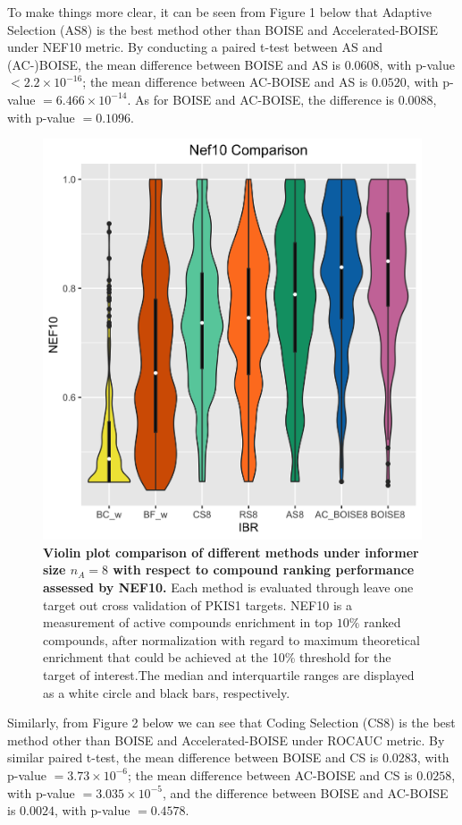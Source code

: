 \documentclass[12pt]{article}
\begin{document}
To make things more clear, it can be seen from Figure 1 below that Adaptive Selection (AS8) is the best method other than BOISE and Accelerated-BOISE under NEF10 metric. By conducting a paired t-test between AS and (AC-)BOISE, the mean difference between BOISE and AS is $0.0608$, with p-value $<2.2\times 10^{-16}$; the mean difference between AC-BOISE and AS is $0.0520$, with p-value $=6.466\times 10^{-14}$. As for BOISE and AC-BOISE, the difference is $0.0088$, with p-value $=0.1096$. 
\begin{figure}[!ht]
\caption{\label{fig:nef} 
{\bf Violin plot comparison of different methods under informer size $n_A =8$ with respect to compound ranking performance assessed by NEF10.} Each method is evaluated through leave one target out cross validation of PKIS1 targets. NEF10 is a measurement of active compounds enrichment in top $10\%$ ranked compounds, after normalization with regard to maximum theoretical enrichment that could be achieved at the 10\% threshold for the target of interest.The median and interquartile ranges are displayed as a white circle and black bars, respectively.}
\centering
\includegraphics[width=5.0in]{pkis1_8_NEF10_AC.png}
\end{figure}

Similarly, from Figure 2 below we can see that Coding Selection (CS8) is the best method other than BOISE and Accelerated-BOISE under ROCAUC metric. By similar paired t-test, the mean difference between BOISE and CS is $0.0283$, with p-value $=3.73\times 10^{-6}$; the mean difference between AC-BOISE and CS is $0.0258$, with p-value $=3.035\times 10^{-5}$, and the difference between BOISE and AC-BOISE is $0.0024$, with p-value $=0.4578$.
\end{document}
